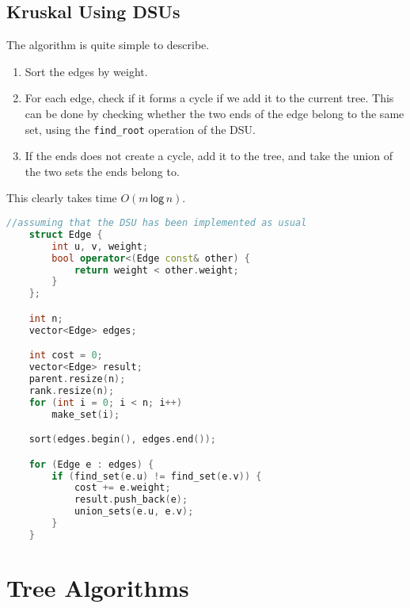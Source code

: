\documentclass[12pt,a4paper]{amsart}
\numberwithin{equation}{section}
\theoremstyle{definition}
\begin{document}
\subsection{Kruskal Using DSUs} The algorithm is quite simple to describe.
\begin{enumerate}
    \item Sort the edges by weight.
    \item For each edge, check if it forms a cycle if we add it to the current tree. This can be done by checking whether the two ends of the edge belong to the same set, using the \verb|find_root| operation of the DSU.
    \item If the ends does not create a cycle, add it to the tree, and take the union of the two sets the ends belong to. 
\end{enumerate}
This clearly takes time $O(m\mathsf{\,log\,}n)$.

\begin{lstlisting}[language=C++]
    //assuming that the DSU has been implemented as usual
    struct Edge {
        int u, v, weight;
        bool operator<(Edge const& other) {
            return weight < other.weight;
        }
    };

    int n;
    vector<Edge> edges;

    int cost = 0;
    vector<Edge> result;
    parent.resize(n);
    rank.resize(n);
    for (int i = 0; i < n; i++)
        make_set(i);

    sort(edges.begin(), edges.end());

    for (Edge e : edges) {
        if (find_set(e.u) != find_set(e.v)) {
            cost += e.weight;
            result.push_back(e);
            union_sets(e.u, e.v);
        }
    }
\end{lstlisting}

\section{Tree Algorithms}
\end{document}
